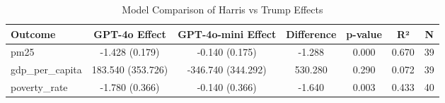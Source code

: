 \begin{table}[htbp]
\centering
\caption{Model Comparison of Harris vs Trump Effects}
\begin{tabular}{lcccccc}
\hline
Outcome & GPT-4o Effect & GPT-4o-mini Effect & Difference & p-value & R² & N \\
\hline
pm25 & -1.428 (0.179) & -0.140 (0.175) & -1.288 & 0.000 & 0.670 & 39 \\
gdp_per_capita & 183.540 (353.726) & -346.740 (344.292) & 530.280 & 0.290 & 0.072 & 39 \\
poverty_rate & -1.780 (0.366) & -0.140 (0.366) & -1.640 & 0.003 & 0.433 & 40 \\
\hline
\end{tabular}
\label{tab:model_comparison}
\end{table}